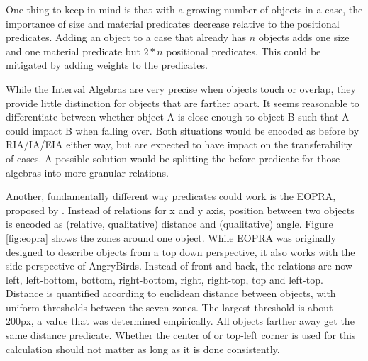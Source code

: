 One thing to keep in mind is that with a growing number of objects in a case, the importance of size and material predicates decrease relative to the positional predicates. Adding an object to a case that already has $n$ objects adds one size and one material predicate but $2*n$ positional predicates. This could be mitigated by adding weights to the predicates.

While the Interval Algebras are very precise when objects touch or overlap, they provide little distinction for objects that are farther apart. It seems reasonable to differentiate between whether object A is close enough to object B such that A could impact B when falling over. Both situations would be encoded as before by RIA/IA/EIA either way, but are expected to have impact on the transferability of cases.
A possible solution would be splitting the before predicate for those algebras into more granular relations.

Another, fundamentally different way predicates could work is the \ac{EOPRA}, proposed by \cite{EOPRA-Perico2016CollaborativeCO}. Instead of relations for x and y axis, position between two objects is encoded as (relative, qualitative) distance and (qualitative) angle.
Figure \ref{fig:eopra} shows the zones around one object. While \ac{EOPRA} was originally designed to describe objects from a top down perspective, it also works with the side perspective of AngryBirds.
Instead of front and back, the relations are now left, left-bottom, bottom, right-bottom, right, right-top, top and left-top.
Distance is quantified according to euclidean distance between objects, with uniform thresholds between the seven zones. The largest threshold is about 200px, a value that was determined empirically. All objects farther away get the same distance predicate. Whether the center of or top-left corner is used for this calculation should not matter as long as it is done consistently.


